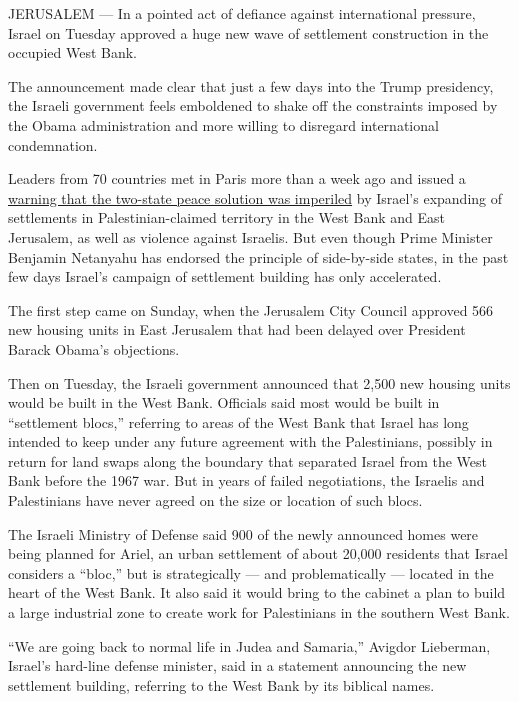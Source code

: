 JERUSALEM --- In a pointed act of defiance against international
pressure, Israel on Tuesday approved a huge new wave of settlement
construction in the occupied West Bank.

The announcement made clear that just a few days into the Trump
presidency, the Israeli government feels emboldened to shake off the
constraints imposed by the Obama administration and more willing to
disregard international condemnation.

Leaders from 70 countries met in Paris more than a week ago and issued a
\href{https://www.nytimes3xbfgragh.onion/2017/01/15/world/middleeast/missing-at-israel-palestinian-peace-conference-israelis-or-palestinians.html}{warning
that the two-state peace solution was imperiled} by Israel's expanding
of settlements in Palestinian-claimed territory in the West Bank and
East Jerusalem, as well as violence against Israelis. But even though
Prime Minister Benjamin Netanyahu has endorsed the principle of
side-by-side states, in the past few days Israel's campaign of
settlement building has only accelerated.

The first step came on Sunday, when the Jerusalem City Council approved
566 new housing units in East Jerusalem that had been delayed over
President Barack Obama's objections.

Then on Tuesday, the Israeli government announced that 2,500 new housing
units would be built in the West Bank. Officials said most would be
built in ``settlement blocs,'' referring to areas of the West Bank that
Israel has long intended to keep under any future agreement with the
Palestinians, possibly in return for land swaps along the boundary that
separated Israel from the West Bank before the 1967 war. But in years of
failed negotiations, the Israelis and Palestinians have never agreed on
the size or location of such blocs.

The Israeli Ministry of Defense said 900 of the newly announced homes
were being planned for Ariel, an urban settlement of about 20,000
residents that Israel considers a ``bloc,'' but is strategically --- and
problematically --- located in the heart of the West Bank. It also said
it would bring to the cabinet a plan to build a large industrial zone to
create work for Palestinians in the southern West Bank.

``We are going back to normal life in Judea and Samaria,'' Avigdor
Lieberman, Israel's hard-line defense minister, said in a statement
announcing the new settlement building, referring to the West Bank by
its biblical names.

